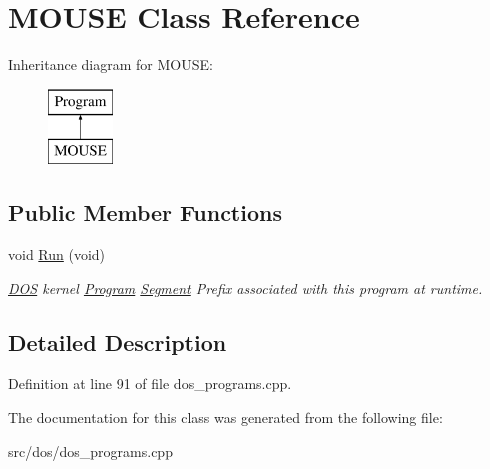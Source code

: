 \hypertarget{classMOUSE}{\section{M\-O\-U\-S\-E Class Reference}
\label{classMOUSE}
}
Inheritance diagram for M\-O\-U\-S\-E\-:\begin{figure}[H]
\begin{center}
\leavevmode
\includegraphics[height=2.000000cm]{classMOUSE}
\end{center}
\end{figure}
\subsection*{Public Member Functions}
\begin{DoxyCompactItemize}
\item 
\hypertarget{classMOUSE_a534674c1b95232e1fa0a0ec93bcbd698}{void \hyperlink{classMOUSE_a534674c1b95232e1fa0a0ec93bcbd698}{Run} (void)}\label{classMOUSE_a534674c1b95232e1fa0a0ec93bcbd698}

\begin{DoxyCompactList}\small\item\em \hyperlink{classDOS}{D\-O\-S} kernel \hyperlink{classProgram}{Program} \hyperlink{structSegment}{Segment} Prefix associated with this program at runtime. \end{DoxyCompactList}\end{DoxyCompactItemize}


\subsection{Detailed Description}


Definition at line 91 of file dos\-\_\-programs.\-cpp.



The documentation for this class was generated from the following file\-:\begin{DoxyCompactItemize}
\item 
src/dos/dos\-\_\-programs.\-cpp\end{DoxyCompactItemize}
